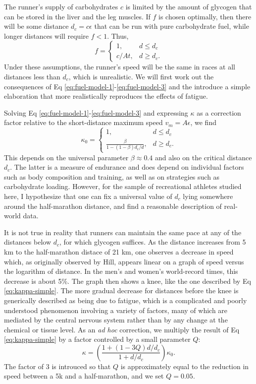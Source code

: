 \documentclass[10pt,letterpaper]{article}
\begin{document}
The runner's supply of carbohydrates $c$ is limited by the amount of glycogen that can be stored
in the liver and the leg muscles. If $f$ is chosen optimally, then there will be some distance
$d_c=c\epsilon$ that can be run with pure carbohydrate fuel, while longer distances will require $f<1$.
Thus,
\begin{equation}\label{eq:fuel-model-3}
  f = \begin{cases}
    1, & d\le d_c \\
    c/At, & d\ge d_c.
\end{cases}
\end{equation}
Under these assumptions, the runner's speed will be the same in races at all distances less than $d_c$,
which is unrealistic. We will first work out the consequences of Eq \ref{eq:fuel-model-1}-\ref{eq:fuel-model-3}
and the introduce a simple elaboration that more realistically reproduces the effects of fatigue.

Solving Eq \ref{eq:fuel-model-1}-\ref{eq:fuel-model-3} and expressing $\kappa$ as a correction factor
relative to the short-distance maximum speed $v_m=A\epsilon$, we find
\begin{equation}\label{eq:kappa-simple}
  \kappa_0 = \begin{cases}
    1, & d\le d_c \\
    \frac{\beta}{1-(1-\beta)d_c/d}, & d\ge d_c.
  \end{cases}
\end{equation}
This depends on the universal parameter $\beta\approx0.4$ and also on the critical distance $d_c$.
The latter is a measure of endurance and does depend on individual factors such as
body composition and training, as well as on strategies such as carbohydrate loading.
However, for the sample of recreational athletes studied here, I hypothesize that one can fix a universal value of $d_c$ lying somewhere
around the half-marathon distance, and find a reasonable description of
real-world data.

It is not true in reality that runners can maintain the same pace at any of the distances below
$d_c$, for which glycogen suffices. As the distance increases from 5 km to the half-marathon
distace of 21 km, one observes a decrease in speed which, as originally observed by Hill,\cite{hill} appears
linear on a graph of speed versus the logarithm of distance. In the men's and women's world-record
times, this decrease is about 5\%. The graph then shows a knee, like the one described by Eq \ref{eq:kappa-simple}.
The more gradual decrease for distances before the knee is generically described as being due to fatigue, which is
a complicated and poorly understood phenomenon involving a variety of factors, many of which are mediated
by the central nervous system rather than by any change at the chemical or tissue level. As an \emph{ad hoc}
correction, we multiply the result of Eq \ref{eq:kappa-simple} by a factor
controlled by a small parameter $Q$:
\begin{equation}\label{eq:kappa}
  \kappa = \left(\frac{1+(1-3Q)d/d_c}{1+d/d_c}\right) \kappa_0.
\end{equation}
The factor of 3 is introuced so that $Q$ is approximately equal to the reduction in speed between a 5k and a half-marathon,
and we set $Q=0.05$.
\end{document}
